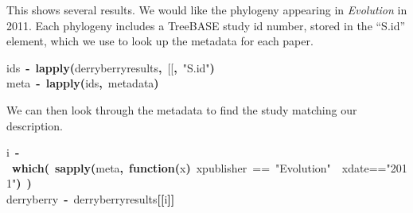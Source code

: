 \documentclass[authoryear, preprint]{elsarticle}
\makeatletter
\newcommand{\hlfunctioncall}[1]{\textcolor[rgb]{.5,0,.33}{\textbf{#1}}}%
\newcommand{\hlstring}[1]{\textcolor[rgb]{.6,.6,1}{#1}}%
\newcommand{\hlkeyword}[1]{\textbf{#1}}%
\newcommand{\hlargument}[1]{\textcolor[rgb]{.69,.25,.02}{#1}}%
\newcommand{\hlformalargs}[1]{\hlargument{#1}}%
\newcommand{\hlassignement}[1]{\textbf{#1}}%
\newcommand{\hlsymbol}[1]{#1}%
\newcommand{\hlstd}[1]{\textcolor[rgb]{0,0,0}{#1}}%
\newenvironment{kframe}{%
 \def\FrameCommand##1{\hskip\@totalleftmargin \hskip-\fboxsep
 \colorbox{shadecolor}{##1}\hskip-\fboxsep
     \hskip-\linewidth \hskip-\@totalleftmargin \hskip\columnwidth}%
 \MakeFramed {\advance\hsize-\width
   \@totalleftmargin\z@ \linewidth\hsize
   \@setminipage}}%
 {\par\unskip\endMakeFramed}
\newenvironment{knitrout}{}{} %
\makeatother
\begin{document}
This shows several results. 
We would like the phylogeny appearing in \emph{Evolution} in 2011.
Each phylogeny includes a TreeBASE study id number, stored in the ``S.id'' element, 
which we use to look up the metadata for each paper.
\begin{knitrout}
\color{fgcolor}\begin{kframe}
\begin{flushleft}
\ttfamily\noindent
\hlsymbol{ids}{\ }\hlassignement{\usebox{\hlnormalsizeboxlessthan}-}{\ }\hlfunctioncall{lapply}\hlkeyword{(}\hlsymbol{derryberry\usebox{\hlnormalsizeboxunderscore}results}\hlkeyword{,}{\ }\hlsymbol{\usebox{\hlnormalsizeboxbacktick}[[\usebox{\hlnormalsizeboxbacktick}}\hlkeyword{,}{\ }\hlstring{"{}S.id"{}}\hlkeyword{)}\hspace*{\fill}\\
\hlstd{}\hlsymbol{meta}{\ }\hlassignement{\usebox{\hlnormalsizeboxlessthan}-}{\ }\hlfunctioncall{lapply}\hlkeyword{(}\hlsymbol{ids}\hlkeyword{,}{\ }\hlsymbol{metadata}\hlkeyword{)}\mbox{}
\normalfont
\end{flushleft}
\end{kframe}
\end{knitrout}


We can then look through the metadata to find the study matching our description.  
\begin{knitrout}
\color{fgcolor}\begin{kframe}
\begin{flushleft}
\ttfamily\noindent
\hlsymbol{i}{\ }\hlassignement{\usebox{\hlnormalsizeboxlessthan}-}{\ }\hlfunctioncall{which}\hlkeyword{(}{\ }\hlfunctioncall{sapply}\hlkeyword{(}\hlsymbol{meta}\hlkeyword{,}{\ }\hlkeyword{function}\hlkeyword{(}\hlformalargs{x}\hlkeyword{)}{\ }\hlsymbol{x}\hlkeyword{\usebox{\hlnormalsizeboxdollar}}\hlsymbol{publisher}{\ }=={\ }\hlstring{"{}Evolution"{}}{\ }\hlkeyword{\usebox{\hlnormalsizeboxand}\usebox{\hlnormalsizeboxand}}{\ }\hlsymbol{x}\hlkeyword{\usebox{\hlnormalsizeboxdollar}}\hlsymbol{date}==\hlstring{"{}2011"{}}\hlkeyword{)}{\ }\hlkeyword{)}\hspace*{\fill}\\
\hlstd{}\hlsymbol{derryberry}{\ }\hlassignement{\usebox{\hlnormalsizeboxlessthan}-}{\ }\hlsymbol{derryberry\usebox{\hlnormalsizeboxunderscore}results}\hlkeyword{[[}\hlsymbol{i}\hlkeyword{]}\hlkeyword{]}\mbox{}
\normalfont
\end{flushleft}
\end{kframe}
\end{knitrout}
\end{document}
